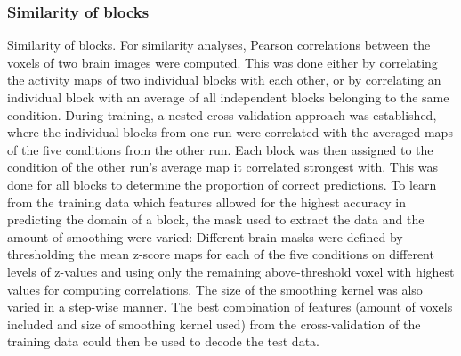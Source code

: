 \documentclass[fleqn,10pt]{SelfArx} %
\begin{document}
\subsubsection*{Similarity of blocks}
Similarity of blocks. For similarity analyses, Pearson correlations between the voxels of two brain images were computed. This was done either by correlating the activity maps of two individual blocks with each other, or by correlating an individual block with an average of all independent blocks belonging to the same condition.
During training, a nested cross-validation approach was established, where the individual blocks from one run were correlated with the averaged maps of the five conditions from the other run. Each block was then assigned to the condition of the other run's average map it correlated strongest with. This was done for all blocks to determine the proportion of correct predictions.
To learn from the training data which features allowed for the highest accuracy in predicting the domain of a block, the mask used to extract the data and the amount of smoothing were varied: Different brain masks were defined by thresholding the mean z-score maps for each of the five conditions on different levels of z-values and using only the remaining above-threshold voxel with highest values for computing correlations. The size of the smoothing kernel was also varied in a step-wise manner. The best combination of features (amount of voxels included and size of smoothing kernel used) from the cross-validation of the training data could then be used to decode the test data.
\end{document}
